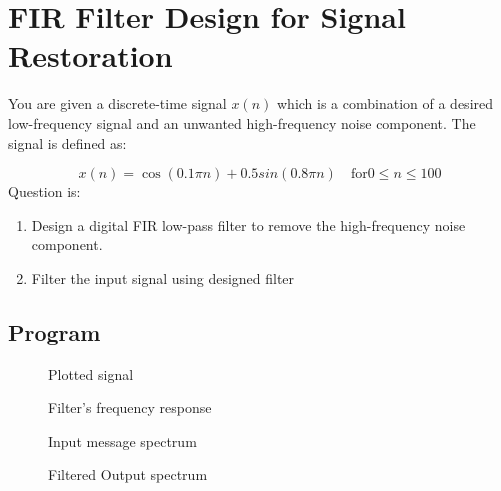 \section{FIR Filter Design for Signal Restoration}

You are given a discrete-time signal $x(n)$ which is a combination of a desired low-frequency signal and an unwanted high-frequency noise component. The signal is defined as:

$$x(n)=\cos(0.1\pi n)+0.5sin(0.8\pi n)\quad \text{for} 0\le n\le 100$$
Question is:
\begin{enumerate}
	\item Design a digital FIR low-pass filter to remove the high-frequency noise component.
	\item Filter the input signal using designed filter
\end{enumerate}

\subsection*{Program}
\begin{figure*}[h!]
	\begin{minipage}{.45\textwidth}
		\caption*{Plotted signal}
		\vspace*{10pt}
		\caption*{Filter's frequency response}
	\end{minipage}%
	\hfill%
	\begin{minipage}{.45\textwidth}
		\caption*{Input message spectrum}
		\vspace*{10pt}
		\caption*{Filtered Output spectrum}
	\end{minipage}
\end{figure*}
